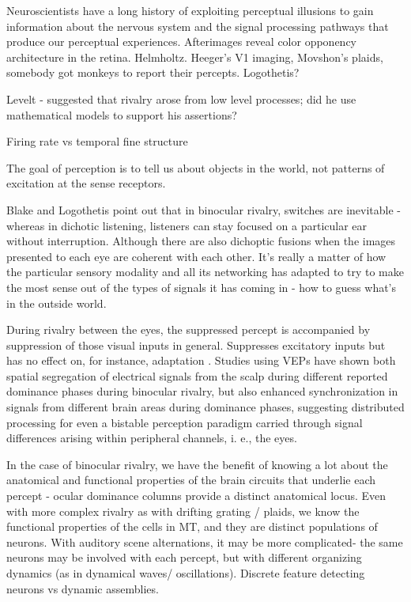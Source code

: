 Neuroscientists have a long history of exploiting perceptual illusions to gain information about the nervous system and the signal processing pathways that produce our perceptual experiences. Afterimages reveal color opponency architecture in the retina. Helmholtz. Heeger's V1 imaging, Movshon's plaids, somebody got monkeys to report their percepts. Logothetis? 

Levelt - suggested that rivalry arose from low level processes; did he use mathematical models to support his assertions?

Firing rate vs temporal fine structure

The goal of perception is to tell us about objects in the world, not patterns of excitation at the sense receptors. \cite{Pressnitzer2011a}

Blake and Logothetis \cite{Blake2002} point out that in binocular rivalry, switches are inevitable - whereas in dichotic listening, listeners can stay focused on a particular ear without interruption. Although there are also dichoptic fusions when the images presented to each eye are coherent with each other. It's really a matter of how the particular sensory modality and all its networking has adapted to try to make the most sense out of the types of signals it has coming in - how to guess what's in the outside world.

During rivalry between the eyes, the suppressed percept is accompanied by suppression of those visual inputs in general.
Suppresses excitatory inputs but has no effect on, for instance, adaptation \cite{Blake2002}. Studies using VEPs have shown both spatial segregation of electrical signals from the scalp during different reported dominance phases during binocular rivalry, but also enhanced synchronization in signals from different brain areas during dominance phases, suggesting distributed processing for even a bistable perception paradigm carried through signal differences arising within peripheral channels, i. e., the eyes.


In the case of binocular rivalry, we have the benefit of knowing a lot about the anatomical and functional properties of the brain circuits that underlie each percept - ocular dominance columns provide a distinct anatomical locus. Even with more complex rivalry as with drifting grating / plaids, we know the functional properties of the cells in MT, and they are distinct populations of neurons. With auditory scene alternations, it may be more complicated- the same neurons may be involved with each percept, but with different organizing dynamics (as in dynamical waves/ oscillations). Discrete feature detecting neurons vs dynamic assemblies.



